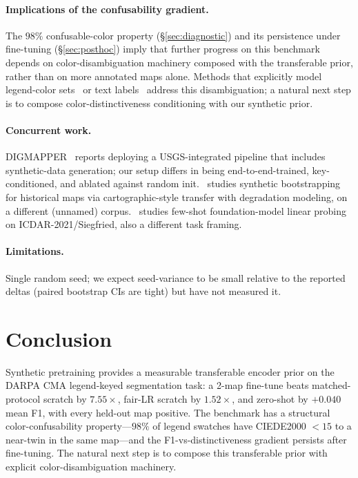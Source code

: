 \documentclass[sigconf,nonacm]{acmart}
\begin{document}
\paragraph{Implications of the confusability gradient.} The $98\%$
confusable-color property (\S\ref{sec:diagnostic}) and its persistence
under fine-tuning (\S\ref{sec:posthoc}) imply that further progress on
this benchmark depends on color-disambiguation machinery composed with
the transferable prior, rather than on more annotated maps alone. Methods
that explicitly model legend-color sets~\cite{lin2023loam} or text
labels~\cite{luo2023icm} address this disambiguation; a natural next step
is to compose color-distinctiveness conditioning with our synthetic prior.

\paragraph{Concurrent work.} DIGMAPPER~\cite{duan2025digmapper} reports
deploying a USGS-integrated pipeline that includes synthetic-data generation;
our setup differs in being end-to-end-trained, key-conditioned, and ablated
against random init. \cite{arzoumanidis2025synthetic}~studies synthetic
bootstrapping for historical maps via cartographic-style transfer with
degradation modeling, on a different (unnamed) corpus.
\cite{sterzinger2025fewshot}~studies few-shot foundation-model linear
probing on ICDAR-2021/Siegfried, also a different task framing.

\paragraph{Limitations.} Single random seed; we expect seed-variance to be
small relative to the reported deltas (paired bootstrap CIs are tight) but
have not measured it.


\section{Conclusion}
\label{sec:conclusion}

Synthetic pretraining provides a measurable transferable encoder prior on
the DARPA CMA legend-keyed segmentation task: a 2-map fine-tune beats
matched-protocol scratch by $7.55\times$, fair-LR scratch by $1.52\times$,
and zero-shot by $+0.040$ mean F1, with every held-out map positive. The
benchmark has a structural color-confusability property---$98\%$ of legend
swatches have CIEDE2000 ${<}15$ to a near-twin in the same map---and the
F1-vs-distinctiveness gradient persists after fine-tuning. The natural
next step is to compose this transferable prior with explicit
color-disambiguation machinery.




\end{document}

